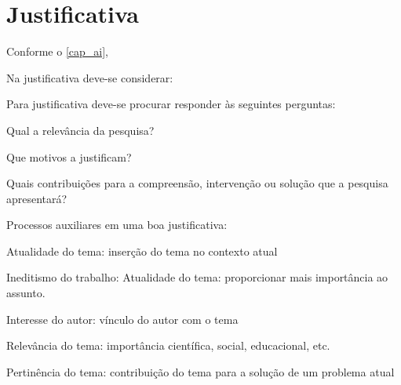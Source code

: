 %
%

\chapter{Justificativa}\label{cap_justificativa}

Conforme o \autoref{cap_ai}, 

Na justificativa deve-se considerar:


    Para justificativa deve-se procurar responder às seguintes perguntas:

       \begin{list}{--}{}
           \item Qual a relevância da pesquisa? 
            \item Que motivos a justificam?
            \item Quais contribuições para a compreensão, intervenção ou solução que a pesquisa apresentará?             
      \end{list}

    Processos auxiliares em uma boa justificativa:

       \begin{list}{--}{}
            \item[Atualidade do tema:] inserção do tema no contexto atual
            \item[Ineditismo do trabalho:] Atualidade do tema: proporcionar mais importância ao assunto.
            \item[Interesse do autor:]  vínculo do autor com o tema
            \item[Relevância do tema:] importância científica, social, educacional, etc.
            \item[Pertinência do tema:] contribuição do tema para a solução de um problema atual
      \end{list}
